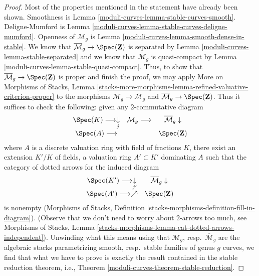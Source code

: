 \begin{proof}
Most of the properties mentioned in the statement have already been shown.
Smoothness is Lemma \ref{moduli-curves-lemma-stable-curves-smooth}.
Deligne-Mumford is Lemma \ref{moduli-curves-lemma-stable-curves-deligne-mumford}.
Openness of $\mathcal{M}_g$ is Lemma \ref{moduli-curves-lemma-smooth-dense-in-stable}.
We know that $\overline{\mathcal{M}}_g \to \Spec(\mathbf{Z})$
is separated by Lemma \ref{moduli-curves-lemma-stable-separated} and we know that
$\overline{\mathcal{M}}_g$ is quasi-compact by
Lemma \ref{moduli-curves-lemma-stable-quasi-compact}.
Thus, to show that $\overline{\mathcal{M}}_g \to \Spec(\mathbf{Z})$
is proper and finish the proof, we may apply
More on Morphisms of Stacks, Lemma
\ref{stacks-more-morphisms-lemma-refined-valuative-criterion-proper}
to the morphisms $\mathcal{M}_g \to \overline{\mathcal{M}}_g$ and
$\overline{\mathcal{M}}_g \to \Spec(\mathbf{Z})$.
Thus it suffices to check the following: given any $2$-commutative diagram
$$
\begin{array}{ccc}\Spec(K) \longrightarrow\underset{j}{\downarrow} & \mathcal{M}_g \longrightarrow & \overline{\mathcal{M}}_g \downarrow \\ \Spec(A) \longrightarrow &  & \Spec(\mathbf{Z})\end{array}
$$
where $A$ is a discrete valuation ring with field of fractions $K$, there
exist an extension $K'/K$ of fields, a valuation ring $A' \subset K'$
dominating $A$ such that the category of dotted arrows for the
induced diagram
$$
\begin{array}{cc}\Spec(K') \longrightarrow\underset{j'}{\downarrow} & \overline{\mathcal{M}}_g \downarrow \\ \Spec(A') \longrightarrow\nearrow & \Spec(\mathbf{Z})\end{array}
$$
is nonempty (Morphisms of Stacks, Definition
\ref{stacks-morphisms-definition-fill-in-diagram}).
(Observe that we don't need to worry about
$2$-arrows too much, see Morphisms of Stacks, Lemma
\ref{stacks-morphisms-lemma-cat-dotted-arrows-independent}).
Unwinding what this means using that
$\mathcal{M}_g$, resp.\ $\overline{\mathcal{M}}_g$ are the algebraic
stacks parametrizing smooth, resp.\ stable families of genus $g$ curves,
we find that what we have to prove is exactly the result contained
in the stable reduction theorem, i.e., Theorem
\ref{moduli-curves-theorem-stable-reduction}.
\end{proof}



